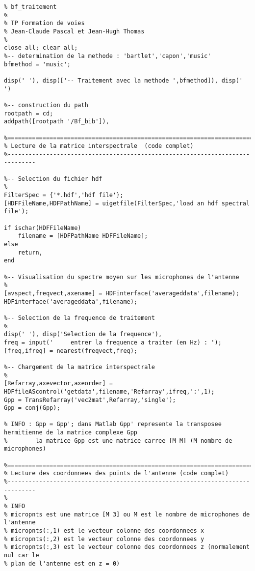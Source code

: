 \begin{verbatim}
% bf_traitement
%
% TP Formation de voies
% Jean-Claude Pascal et Jean-Hugh Thomas
%
close all; clear all;
%-- determination de la methode : 'bartlet','capon','music'
bfmethod = 'music';

disp(' '), disp(['-- Traitement avec la methode ',bfmethod]), disp(' ')

%-- construction du path
rootpath = cd;
addpath([rootpath '/Bf_bib']),

%==============================================================================
% Lecture de la matrice interspectrale  (code complet)
%------------------------------------------------------------------------------

%-- Selection du fichier hdf
%
FilterSpec = {'*.hdf','hdf file'};
[HDFFileName,HDFPathName] = uigetfile(FilterSpec,'load an hdf spectral file');
        
if ischar(HDFFileName)
    filename = [HDFPathName HDFFileName];
else
    return,
end

%-- Visualisation du spectre moyen sur les microphones de l'antenne
%
[avspect,freqvect,axename] = HDFinterface('averageddata',filename);   
HDFinterface('averageddata',filename);

%-- Selection de la frequence de traitement
%
disp(' '), disp('Selection de la frequence'),
freq = input('     entrer la frequence a traiter (en Hz) : ');
[freq,ifreq] = nearest(freqvect,freq);

%-- Chargement de la matrice interspectrale
%
[Refarray,axevector,axeorder] = HDFfileAScontrol('getdata',filename,'Refarray',ifreq,':',1);
Gpp = TransRefarray('vec2mat',Refarray,'single');     
Gpp = conj(Gpp);

% INFO : Gpp = Gpp'; dans Matlab Gpp' represente la transposee hermitienne de la matrice complexe Gpp
%        la matrice Gpp est une matrice carree [M M] (M nombre de microphones)

%==============================================================================
% Lecture des coordonnees des points de l'antenne (code complet)
%------------------------------------------------------------------------------
%
% INFO
% micropnts est une matrice [M 3] ou M est le nombre de microphones de l'antenne
% micropnts(:,1) est le vecteur colonne des coordonnees x
% micropnts(:,2) est le vecteur colonne des coordonnees y
% micropnts(:,3) est le vecteur colonne des coordonnees z (normalement nul car le 
% plan de l'antenne est en z = 0)


\end{verbatim}
